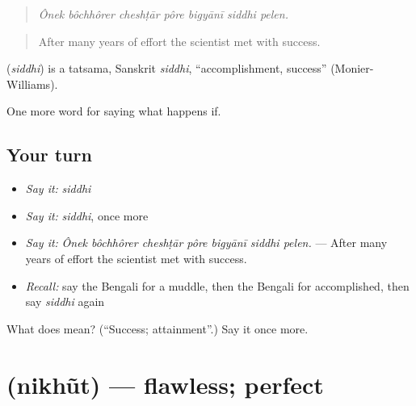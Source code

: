 \begin{quote}
      
\end{quote}

\begin{quote}
\emph{Ônek bôchhôrer cheshṭār pôre bigyānī siddhi pelen.}
\end{quote}

\begin{quote}
After many years of effort the scientist met with success.
\end{quote}

\begin{cousinweb}
\textbf{} (\emph{siddhi}) is a tatsama, Sanskrit \emph{siddhi}, \textquotedblleft{}accomplishment, success\textquotedblright{} (Monier-Williams).
\end{cousinweb}

\begin{grammarlens}[title={What you've built}]
One more word for saying what happens if.
\end{grammarlens}

\subsection*{Your turn}
\begin{itemize}
\raggedright
  \item \emph{Say it:} \emph{siddhi}
  \item \emph{Say it:} \emph{siddhi}, once more
  \item \emph{Say it:} \emph{Ônek bôchhôrer cheshṭār pôre bigyānī siddhi pelen.} — After many years of effort the scientist met with success.
  \item \emph{Recall:} say the Bengali for a muddle, then the Bengali for accomplished, then say \emph{siddhi} again
\end{itemize}

\begin{tcolorbox}[breakable,colback=teal!4,colframe=teal!35!black,title={Before you move on}]
What does  mean? (\textquotedblleft{}Success; attainment\textquotedblright{}.) Say it once more.
\end{tcolorbox}
\section[\texorpdfstring{\bn{নিখুঁত} (nikhũt)}{নিখুঁত (nikhũt)}]{ (nikhũt) — flawless; perfect}


